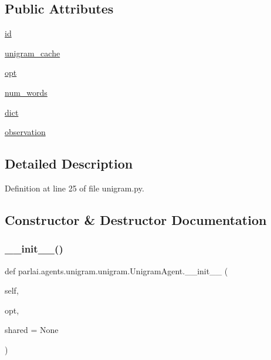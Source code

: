 \subsection*{Public Attributes}
\begin{DoxyCompactItemize}
\item 
\hyperlink{classparlai_1_1agents_1_1unigram_1_1unigram_1_1UnigramAgent_a574f4bdfd253231cd3ae54d9b9d3a6c3}{id}
\item 
\hyperlink{classparlai_1_1agents_1_1unigram_1_1unigram_1_1UnigramAgent_a18103467daa976a54a84feb931cdf2be}{unigram\+\_\+cache}
\item 
\hyperlink{classparlai_1_1agents_1_1unigram_1_1unigram_1_1UnigramAgent_abfbd6ca4f56545ac9c4514f38e65d1a2}{opt}
\item 
\hyperlink{classparlai_1_1agents_1_1unigram_1_1unigram_1_1UnigramAgent_a115f363de67abb097c3abf3ffe99a1da}{num\+\_\+words}
\item 
\hyperlink{classparlai_1_1agents_1_1unigram_1_1unigram_1_1UnigramAgent_a26ced196313bd88939a230881b857ff7}{dict}
\item 
\hyperlink{classparlai_1_1agents_1_1unigram_1_1unigram_1_1UnigramAgent_a590ee9adde9db2a7f65b28455e966a1b}{observation}
\end{DoxyCompactItemize}


\subsection{Detailed Description}


Definition at line 25 of file unigram.\+py.



\subsection{Constructor \& Destructor Documentation}
\mbox{\label{classparlai_1_1agents_1_1unigram_1_1unigram_1_1UnigramAgent_a8e406a0b849d5f823b66329c5285c29c}} 
\subsubsection{\texorpdfstring{\+\_\+\+\_\+init\+\_\+\+\_\+()}{\_\_init\_\_()}}
{\footnotesize\ttfamily def parlai.\+agents.\+unigram.\+unigram.\+Unigram\+Agent.\+\_\+\+\_\+init\+\_\+\+\_\+ (\begin{DoxyParamCaption}\item[{}]{self,  }\item[{}]{opt,  }\item[{}]{shared = {\ttfamily None} }\end{DoxyParamCaption})}

